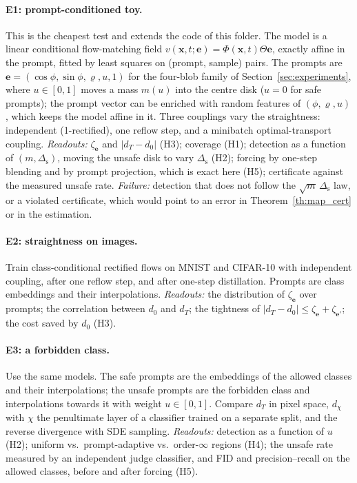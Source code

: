 \documentclass{article}
\newcommand{\bx}{\mathbf{x}}
\newcommand{\be}{\mathbf{e}}                       %
\theoremstyle{plain}
\begin{document}
\paragraph{E1: prompt-conditioned toy.} This is the cheapest test and extends the code of this folder. The
model is a linear conditional flow-matching field $v(\bx,t;\be)=\Phi(\bx,t)\Theta\be$, exactly affine in the
prompt, fitted by least squares on (prompt, sample) pairs. The prompts are
$\be=(\cos\phi,\sin\phi,\varrho,u,1)$ for the four-blob family of Section~\ref{sec:experiments}, where
$u\in[0,1]$ moves a mass $m(u)$ into the centre disk ($u=0$ for safe prompts); the prompt vector can be
enriched with random features of $(\phi,\varrho,u)$, which keeps the model affine in it. Three couplings vary the
straightness: independent (1-rectified), one reflow step, and a minibatch optimal-transport coupling.
\emph{Readouts:} $\zeta_{\be}$ and $|d_T-d_0|$ (H3); coverage (H1); detection as a function of $(m,\Delta_{\mathrm{s}})$,
moving the unsafe disk to vary $\Delta_{\mathrm{s}}$ (H2); forcing by one-step blending and by prompt projection,
which is exact here (H5); certificate against the measured unsafe rate.
\emph{Failure:} detection that does not follow the $\sqrt m\,\Delta_{\mathrm{s}}$ law, or a violated certificate,
which would point to an error in Theorem~\ref{th:map_cert} or in the estimation.

\paragraph{E2: straightness on images.} Train class-conditional rectified flows on MNIST
\citep{lecun1998gradient} and CIFAR-10 \citep{krizhevsky2009learning} with independent coupling, after one
reflow step, and after one-step distillation. Prompts are class embeddings and their interpolations.
\emph{Readouts:} the distribution of $\zeta_{\be}$ over prompts; the correlation between $d_0$ and $d_T$; the
tightness of $|d_T-d_0|\leq\zeta_{\be}+\zeta_{\be'}$; the cost saved by $d_0$ (H3).

\paragraph{E3: a forbidden class.} Use the same models. The safe prompts are the embeddings of the allowed
classes and their interpolations; the unsafe prompts are the forbidden class and interpolations towards it
with weight $u\in[0,1]$. Compare $d_T$ in pixel space, $d_\chi$ with $\chi$ the penultimate layer of a classifier
trained on a separate split, and the reverse divergence with SDE sampling.
\emph{Readouts:} detection as a function of $u$ (H2); uniform vs.\ prompt-adaptive vs.\ order-$\infty$ regions
(H4); the unsafe rate measured by an independent judge classifier, and FID and precision--recall on the
allowed classes, before and after forcing (H5).
\end{document}
